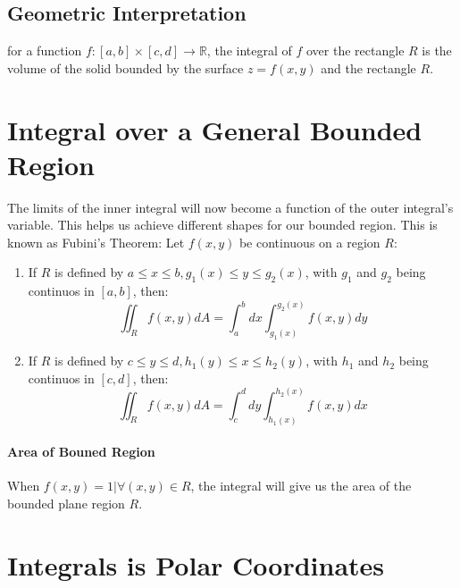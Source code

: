 \documentclass{article}
\begin{document}
\subsection{Geometric Interpretation}
for a function $f: [a,b] \times [c,d] \rightarrow \mathbb{R}$, the integral of $f$ over the rectangle $R$ is the volume of the solid bounded by the surface $z = f(x,y)$ and the rectangle $R$.


\section{Integral over a General Bounded Region}
The limits of the inner integral will now become a function of the outer integral's variable.
This helps us achieve different shapes for our bounded region.
This is known as Fubini's Theorem:
Let $f(x,y)$ be continuous on a region $R$:
\begin{enumerate}
    \item If $R$ is defined by $ a \leq x \leq b, g_1(x) \leq y \leq g_2(x)$, with $g_1$ and $g_2$ being continuos in $\left[a,b\right]$, then:
    \[ \iint_{R} f(x,y) dA = \int_{a}^{b} dx \int_{g_1(x)}^{g_2(x)} f(x,y) dy \]
    \item If $R$ is defined by $ c \leq y \leq d, h_1(y) \leq x \leq h_2(y)$, with $h_1$ and $h_2$ being continuos in $\left[c,d\right]$, then:
    \[ \iint_{R} f(x,y) dA = \int_{c}^{d} dy \int_{h_1(x)}^{h_2(x)} f(x,y) dx \]
\end{enumerate}
\paragraph{Area of Bouned Region} When $f(x,y) = 1| \forall (x,y) \in R$, the integral will give us the area of the bounded plane region $R$.

\section{Integrals is Polar Coordinates}
\end{document}
